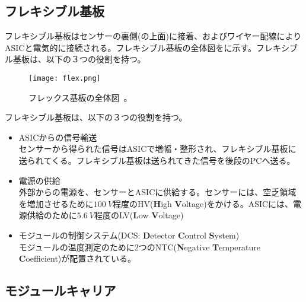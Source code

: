 

\subsection{フレキシブル基板}
\label{sec:flex}

フレキシブル基板はセンサーの裏側(の上面)に接着、およびワイヤー配線によりASICと電気的に接続される。フレキシブル基板の全体図をに示す。フレキシブル基板は、以下の３つの役割を持つ。

\begin{figure}[tbp]
  \centering
  \texttt{[image: flex.png]}
  \caption[フレックス基板]{フレックス基板の全体図\ \cite{itk}。}
  \label{fig:flex}
\end{figure}

フレキシブル基板は、以下の３つの役割を持つ。
\begin{itemize}
  \item ASICからの信号輸送  \\
  センサーから得られた信号はASICで増幅・整形され、フレキシブル基板に送られてくる。フレキシブル基板は送られてきた信号を後段のPCへ送る。
  \item 電源の供給 \\
  外部からの電源を、センサーとASICに供給する。センサーには、空乏領域を増加させるために$100\ \si{V}$程度のHV(\textbf{H}igh \textbf{V}oltage)をかける。ASICには、電源供給のために$5.6\ \si{V}$程度のLV(\textbf{L}ow \textbf{V}oltage)
  \item モジュールの制御システム(DCS: \textbf{D}etector \textbf{C}ontrol \textbf{S}ystem) \\
  モジュールの温度測定のために2つのNTC(\textbf{N}egative \textbf{T}emperature \textbf{C}oefficient)が配置されている。
\end{itemize}

\subsection{モジュールキャリア}
\label{sec:carrier}

